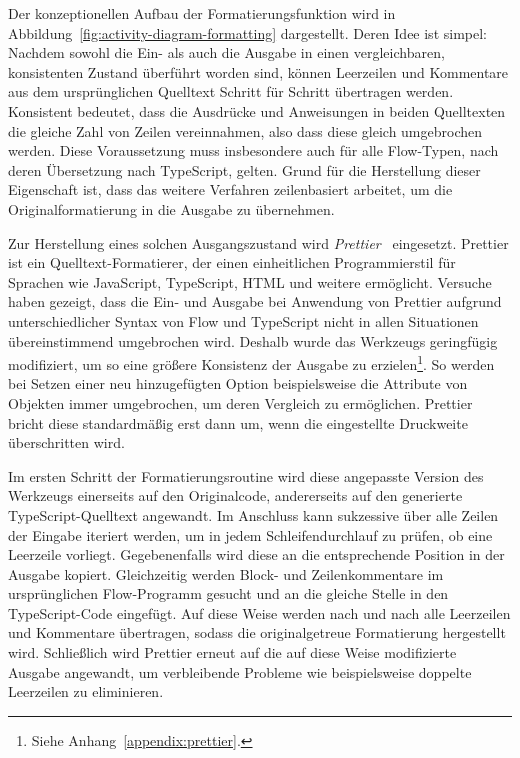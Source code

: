 Der konzeptionellen Aufbau der Formatierungsfunktion wird in Abbildung~\ref{fig:activity-diagram-formatting} dargestellt. Deren Idee ist simpel: Nachdem sowohl die Ein- als auch die Ausgabe in einen vergleichbaren, konsistenten Zustand überführt worden sind, können Leerzeilen und Kommentare aus dem ursprünglichen Quelltext Schritt für Schritt übertragen werden. Konsistent bedeutet, dass die Ausdrücke und Anweisungen in beiden Quelltexten die gleiche Zahl von Zeilen vereinnahmen, also dass diese gleich umgebrochen werden. Diese Voraussetzung muss insbesondere auch für alle Flow-Typen, nach deren Übersetzung nach TypeScript, gelten. Grund für die Herstellung dieser Eigenschaft ist, dass das weitere Verfahren zeilenbasiert arbeitet, um die Originalformatierung in die Ausgabe zu übernehmen.

Zur Herstellung eines solchen Ausgangszustand wird \textit{Prettier}~\autocite{SOFTWARE:PRETTIER} eingesetzt. Prettier ist ein Quelltext-Formatierer, der einen einheitlichen Programmierstil für Sprachen wie JavaScript, TypeScript, HTML und weitere ermöglicht.
Versuche haben gezeigt, dass die Ein- und Ausgabe bei Anwendung von Prettier aufgrund unterschiedlicher Syntax von Flow und TypeScript nicht in allen Situationen übereinstimmend umgebrochen wird. Deshalb wurde das Werkzeugs geringfügig modifiziert, um so eine größere Konsistenz der Ausgabe zu erzielen\footnote{Siehe Anhang~\ref{appendix:prettier}.}. So werden bei Setzen einer neu hinzugefügten Option beispielsweise die Attribute von Objekten immer umgebrochen, um deren Vergleich zu ermöglichen. Prettier bricht diese standardmäßig erst dann um, wenn die eingestellte Druckweite überschritten wird.

Im ersten Schritt der Formatierungsroutine wird diese angepasste Version des Werkzeugs einerseits auf den Originalcode, andererseits auf den generierte TypeScript-Quelltext angewandt. Im Anschluss kann sukzessive über alle Zeilen der Eingabe iteriert werden, um in jedem Schleifendurchlauf zu prüfen, ob eine Leerzeile vorliegt. Gegebenenfalls wird diese an die entsprechende Position in der Ausgabe kopiert. Gleichzeitig werden Block- und Zeilenkommentare im ursprünglichen Flow-Programm gesucht und an die gleiche Stelle in den TypeScript-Code eingefügt. Auf diese Weise werden nach und nach alle Leerzeilen und Kommentare übertragen, sodass die originalgetreue Formatierung hergestellt wird. Schließlich wird Prettier erneut auf die auf diese Weise modifizierte Ausgabe angewandt, um verbleibende Probleme wie beispielsweise doppelte Leerzeilen zu eliminieren.
